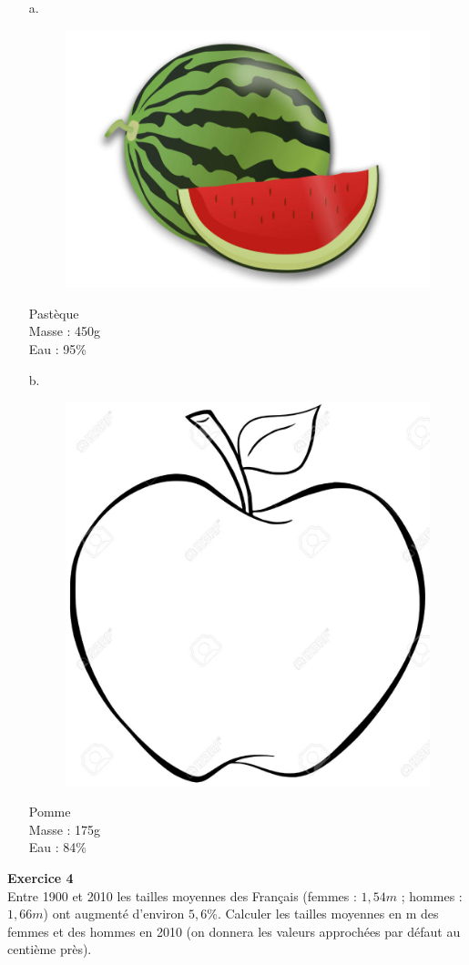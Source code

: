 \documentclass[12pt]{article}
\newcommand{\Pointille}[1][3]{\multido{}{#1}{    \makebox[\linewidth]{\dotfill}\\[\parskip]}}
\begin{document}
\begin{multicols}{2}
  \begin{enumerate}
  \item[a.] 
    \begin{figure}[H]
      \centering
      \includegraphics[width=0.3\linewidth]{sources/2/pasteque.jpg}
    \end{figure}
    Pastèque\\
    Masse : 450g\\
    Eau : 95\%\\
    \Pointille[3]

  \item [b.]
    \begin{figure}[H]
      \centering
      \includegraphics[width=0.2\linewidth]{sources/2/pomme.jpg}
    \end{figure}
    Pomme\\
    Masse : 175g\\
    Eau : 84\%\\
    \Pointille[3]
  \end{enumerate}
\end{multicols}


\begin{multicols}{2}
  \textbf{Exercice 4}\\
  Entre 1900 et 2010 les tailles moyennes des Français (femmes : $1,54m$ ; hommes : $1,66m$) ont augmenté d'environ $5,6\%$. Calculer les tailles moyennes en m des femmes et des hommes en 2010 (on donnera les valeurs approchées par défaut au centième près).\\

  \Pointille[6]

\end{multicols}
\end{document}
